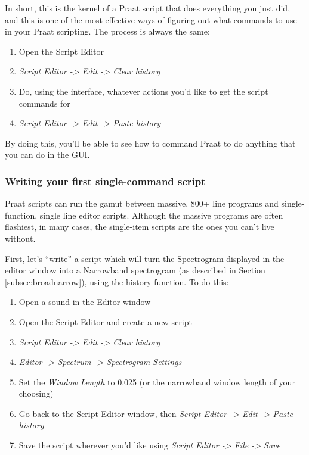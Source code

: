 \documentclass[11pt]{article}
\def\tightlist{}
\begin{document}
In short, this is the kernel of a Praat script that does everything you
just did, and this is one of the most effective ways of figuring out
what commands to use in your Praat scripting. The process is always the
same:

\begin{enumerate}
\def\labelenumi{\arabic{enumi}.}
\tightlist
\item
  Open the Script Editor
\item
  \emph{Script Editor -\textgreater{} Edit -\textgreater{} Clear
  history}
\item
  Do, using the interface, whatever actions you'd like to get the script
  commands for
\item
  \emph{Script Editor -\textgreater{} Edit -\textgreater{} Paste
  history}
\end{enumerate}

By doing this, you'll be able to see how to command Praat to do anything
that you can do in the GUI.

\hypertarget{writing-your-first-single-command-script}{%
\subsubsection{Writing your first single-command
script}\label{writing-your-first-single-command-script}}

Praat scripts can run the gamut between massive, 800+ line programs and
single-function, single line editor scripts. Although the massive
programs are often flashiest, in many cases, the single-item scripts are
the ones you can't live without.

First, let's ``write'' a script which will turn the Spectrogram
displayed in the editor window into a Narrowband spectrogram (as
described in Section \ref{subsec:broadnarrow}), using the history
function. To do this:

\begin{enumerate}
\def\labelenumi{\arabic{enumi}.}
\tightlist
\item
  Open a sound in the Editor window
\item
  Open the Script Editor and create a new script
\item
  \emph{Script Editor -\textgreater{} Edit -\textgreater{} Clear
  history}
\item
  \emph{Editor -\textgreater{} Spectrum -\textgreater{} Spectrogram
  Settings}
\item
  Set the \emph{Window Length} to 0.025 (or the narrowband window length
  of your choosing)
\item
  Go back to the Script Editor window, then \emph{Script Editor
  -\textgreater{} Edit -\textgreater{} Paste history}
\item
  Save the script wherever you'd like using \emph{Script Editor
  -\textgreater{} File -\textgreater{} Save}
\end{enumerate}
\end{document}
